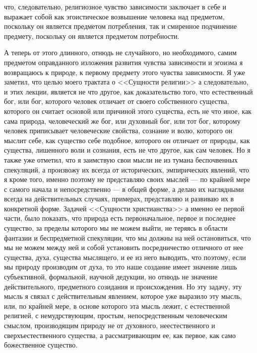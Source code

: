 \documentclass[12pt]{article}
\begin{document}
что, следовательно, религиозное чувство зависимости заключает в себе и выражает собой как эгоистическое возвышение человека над предметом, поскольку он является предметом потребления, так и смиренное подчинение предмету, поскольку он является предметом потребности. 

А теперь от этого длинного, отнюдь не случайного, но необходимого, самим предметом оправданного изложения развития чувства зависимости и эгоизма я возвращаюсь к природе, к первому предмету этого чувства зависимости. Я уже заметил, что целью моего трактата о <<Сущности религии>>  а следовательно, и этих лекции, является не что другое, как доказательство того, что естественный бог, или бог, которого человек отличает от своего собственного существа, которого он считает основой или причиной этого существа, есть не что иное, как сама природа, человеческий же бог, или духовный бог, или тот бог, которому человек приписывает человеческие свойства, сознание и волю, которого он мыслит себе, как существо себе подобное, которого он отличает от природы, как существа, лишенного воли и сознания, есть не что другое, как сам человек. Но я также уже отметил, что я заимствую свои мысли не из тумана беспочвенных спекуляций, а произвожу их всегда от исторических, эмпирических явлений, что я кроме того, именно поэтому не представляю своих мыслей --- по крайней мере с самого начала и непосредственно --- в общей форме, а делаю их наглядными всегда на действительных случаях, примерах, представляю и развиваю их в конкретной форме. Задачей <<Сущности христианства>>  а именно ее первой части, было показать, что природа есть первоначальное, первое и последнее существо, за пределы которого мы не можем выйти, не теряясь в области фантазии и беспредметной спекуляции, что мы должны на ней остановиться, что мы не можем между ней и собой установить посредничество отличного от нее существа, духа, существа мыслящего, и ее из него выводить, что поэтому, если мы природу производим от духа, то это наше создание имеет значение лишь субъективной, формальной, научной дедукции, но отнюдь не значение действительного, предметного созидания и происхождения. Но эту задачу, эту мысль я связал с действительным явлением, которое уже выразило эту мысль, или, по крайней мере, в основе которого эта мысль лежит, с естественной религией, с немудрствующим, простым, непосредственным человеческим смыслом, производящим природу не от духовного, неестественного и сверхъестественного существа, а рассматривающим ее, как первое, как само божественное существо. 
\end{document}
